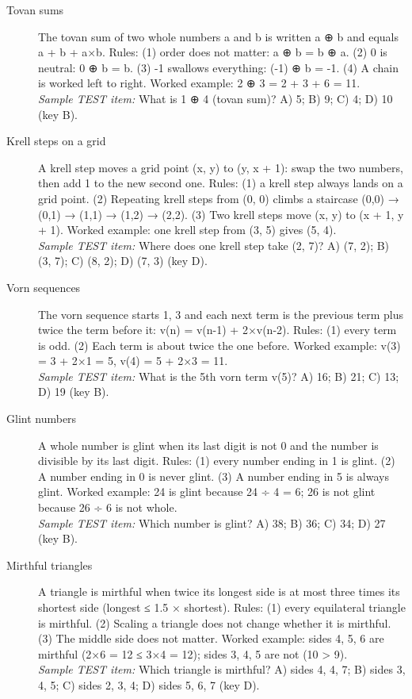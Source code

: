 \begin{description}
\item[Tovan sums] The tovan sum of two whole numbers a and b is written a ⊕ b and equals a + b + a×b. Rules: (1) order does not matter: a ⊕ b = b ⊕ a. (2) 0 is neutral: 0 ⊕ b = b. (3) -1 swallows everything: (-1) ⊕ b = -1. (4) A chain is worked left to right. Worked example: 2 ⊕ 3 = 2 + 3 + 6 = 11.\\ \emph{Sample TEST item:} What is 1 ⊕ 4 (tovan sum)? A) 5; B) 9; C) 4; D) 10 (key B).
\item[Krell steps on a grid] A krell step moves a grid point (x, y) to (y, x + 1): swap the two numbers, then add 1 to the new second one. Rules: (1) a krell step always lands on a grid point. (2) Repeating krell steps from (0, 0) climbs a staircase (0,0) → (0,1) → (1,1) → (1,2) → (2,2). (3) Two krell steps move (x, y) to (x + 1, y + 1). Worked example: one krell step from (3, 5) gives (5, 4).\\ \emph{Sample TEST item:} Where does one krell step take (2, 7)? A) (7, 2); B) (3, 7); C) (8, 2); D) (7, 3) (key D).
\item[Vorn sequences] The vorn sequence starts 1, 3 and each next term is the previous term plus twice the term before it: v(n) = v(n-1) + 2×v(n-2). Rules: (1) every term is odd. (2) Each term is about twice the one before. Worked example: v(3) = 3 + 2×1 = 5, v(4) = 5 + 2×3 = 11.\\ \emph{Sample TEST item:} What is the 5th vorn term v(5)? A) 16; B) 21; C) 13; D) 19 (key B).
\item[Glint numbers] A whole number is glint when its last digit is not 0 and the number is divisible by its last digit. Rules: (1) every number ending in 1 is glint. (2) A number ending in 0 is never glint. (3) A number ending in 5 is always glint. Worked example: 24 is glint because 24 ÷ 4 = 6; 26 is not glint because 26 ÷ 6 is not whole.\\ \emph{Sample TEST item:} Which number is glint? A) 38; B) 36; C) 34; D) 27 (key B).
\item[Mirthful triangles] A triangle is mirthful when twice its longest side is at most three times its shortest side (longest ≤ 1.5 × shortest). Rules: (1) every equilateral triangle is mirthful. (2) Scaling a triangle does not change whether it is mirthful. (3) The middle side does not matter. Worked example: sides 4, 5, 6 are mirthful (2×6 = 12 ≤ 3×4 = 12); sides 3, 4, 5 are not (10 > 9).\\ \emph{Sample TEST item:} Which triangle is mirthful? A) sides 4, 4, 7; B) sides 3, 4, 5; C) sides 2, 3, 4; D) sides 5, 6, 7 (key D).

\end{description}
